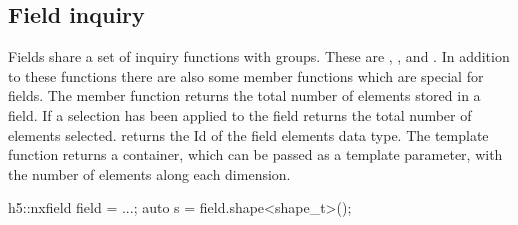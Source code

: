 \subsection{Field inquiry}

Fields share a set of inquiry functions with groups. These are , 
, and . In addition to these functions
there are also some member functions which are special for fields. 
The  member function returns the total number of elements 
stored in a field. If a selection has been applied to the field 
returns the total number of elements selected. 
 returns the Id of the field elements data type. 
The  template function returns a container, which can be passed as
a template parameter, with the number of elements along each dimension. 
\begin{cppcode}
h5::nxfield field = ...;
auto s = field.shape<shape_t>();
\end{cppcode}
